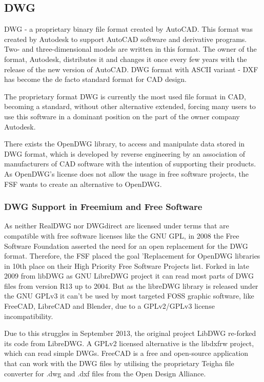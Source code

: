 \documentclass[a4paper, 11pt, article]{report}
\begin{document}
\subsection{DWG}
   
DWG - a proprietary binary file format created by AutoCAD. This format was created by Autodesk to support AutoCAD software and derivative programs. Two- and three-dimensional models are written in this format. The owner of the format, Autodesk, distributes it and changes it once every few years with the release of the new version of AutoCAD. DWG format with ASCII variant - DXF has become the de facto standard format for CAD design.

The proprietary format DWG is currently the most used file format in CAD, becoming a standard, without other alternative extended, forcing many users to use this software in a dominant position on the part of the owner company Autodesk.

There exists the OpenDWG library, to access and manipulate data stored in DWG format, which is developed by reverse engineering by an association of manufacturers of CAD software with the intention of supporting their products. As OpenDWG's license does not allow the usage in free software projects, the FSF wants to create an alternative to OpenDWG.

\subsubsection{DWG Support in Freemium and Free Software}

As neither RealDWG nor DWGdirect are licensed under terms that are compatible with free software licenses like the GNU GPL, in 2008 the Free Software Foundation asserted the need for an open replacement for the DWG format. Therefore, the FSF placed the goal 'Replacement for OpenDWG libraries in 10th place on their High Priority Free Software Projects list. Forked in late 2009 from libDWG as GNU LibreDWG project it can read most parts of DWG files from version R13 up to 2004. But as the libreDWG library is released under the GNU GPLv3 it can't be used by most targeted FOSS graphic software, like FreeCAD, LibreCAD and Blender, due to a GPLv2/GPLv3 license incompatibility. 

Due to this struggles in September 2013, the original project LibDWG re-forked its code from LibreDWG. A GPLv2 licensed alternative is the libdxfrw project, which can read simple DWGs. FreeCAD is a free and open-source application that can work with the DWG files by utilising the proprietary Teigha file converter for .dwg and .dxf files from the Open Design Alliance. 
\end{document}
